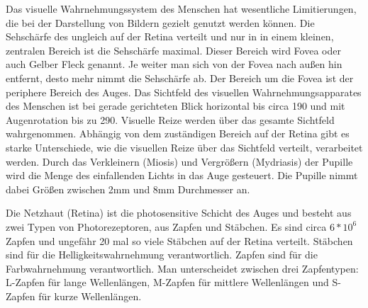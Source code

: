 Das visuelle Wahrnehmungssystem des Menschen hat wesentliche Limitierungen, die bei der Darstellung von Bildern gezielt genutzt werden können.
Die Sehschärfe des ungleich auf der Retina verteilt und nur in in einem kleinen, zentralen Bereich ist die Sehschärfe maximal.
Dieser Bereich wird Fovea oder auch Gelber Fleck genannt.
Je weiter man sich von der Fovea nach außen hin entfernt, desto mehr nimmt die Sehschärfe ab.
Der Bereich um die Fovea ist der periphere Bereich des Auges.
Das Sichtfeld des visuellen Wahrnehmungsapparates des Menschen ist bei gerade gerichteten Blick horizontal bis circa 190\textdegree{} und mit Augenrotation bis zu 290\textdegree{}.
Visuelle Reize werden über das gesamte Sichtfeld wahrgenommen.
Abhängig von dem zuständigen Bereich auf der Retina gibt es starke Unterschiede, wie die visuellen Reize über das Sichtfeld verteilt, verarbeitet werden.
Durch das Verkleinern (Miosis) und Vergrößern (Mydriasis) der Pupille wird die Menge des einfallenden Lichts in das Auge gesteuert.
Die Pupille nimmt dabei Größen zwischen 2mm und 8mm Durchmesser an.

Die Netzhaut (Retina) ist die photosensitive Schicht des Auges und besteht aus zwei Typen von Photorezeptoren, aus Zapfen und Stäbchen.
Es sind circa $6*10^6$ Zapfen und ungefähr 20 mal so viele Stäbchen auf der Retina verteilt.
Stäbchen sind für die Helligkeitswahrnehmung verantwortlich.
Zapfen sind für die Farbwahrnehmung verantwortlich.
Man unterscheidet zwischen drei Zapfentypen: L-Zapfen für lange Wellenlängen, M-Zapfen für mittlere Wellenlängen und S-Zapfen für kurze Wellenlängen.

